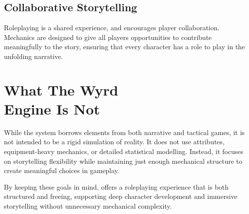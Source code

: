 
\subsection{Collaborative Storytelling}
Roleplaying is a shared experience, and \wyrd encourages player collaboration. Mechanics are designed to give all players opportunities to contribute meaningfully to the story, ensuring that every character has a role to play in the unfolding narrative.

\newcolumn
\section[What The Wyrd Engine Is Not]{What The Wyrd\\Engine Is Not}
While the system borrows elements from both narrative and tactical games, it is not intended to be a rigid simulation of reality. It does not use attributes, equipment-heavy mechanics, or detailed statistical modelling. Instead, it focuses on storytelling flexibility while maintaining just enough mechanical structure to create meaningful choices in gameplay.

By keeping these goals in mind, \wyrd offers a roleplaying experience that is both structured and freeing, supporting deep character development and immersive storytelling without unnecessary mechanical complexity.

